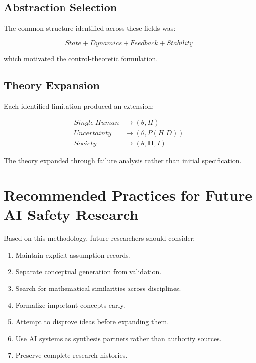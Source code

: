 \documentclass[11pt]{article}
\begin{document}
\subsection{Abstraction Selection}


The common structure identified across these fields was:


\[
State
+
Dynamics
+
Feedback
+
Stability
\]


which motivated the control-theoretic formulation.



\subsection{Theory Expansion}


Each identified limitation produced an extension:


\[
\begin{aligned}
Single\ Human
&\rightarrow
(\theta,H)
\\
Uncertainty
&\rightarrow
(\theta,P(H|D))
\\
Society
&\rightarrow
(\theta,\mathbf H,I)
\end{aligned}
\]


The theory expanded through failure analysis rather than initial
specification.



\section{Recommended Practices for Future AI Safety Research}


Based on this methodology, future researchers should consider:



\begin{enumerate}


\item Maintain explicit assumption records.

\item Separate conceptual generation from validation.

\item Search for mathematical similarities across disciplines.

\item Formalize important concepts early.

\item Attempt to disprove ideas before expanding them.

\item Use AI systems as synthesis partners rather than authority
sources.

\item Preserve complete research histories.

\end{enumerate}
\end{document}
